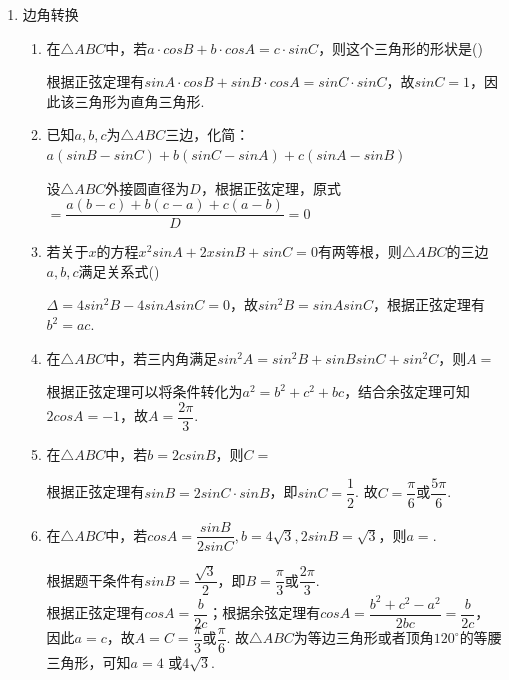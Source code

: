 \begin{enumerate}
\item 边角转换
    \begin{enumerate}
        \item 在$\triangle ABC$中，若$a \cdot cosB + b \cdot cosA = c \cdot sin C$，则这个三角形的形状是\dotfill()
        \begin{jieda}
            根据正弦定理有$sinA \cdot cosB + sinB \cdot cosA = sinC \cdot sin C$，故$sinC = 1$，因此该三角形为直角三角形.
        \end{jieda}
        \item 已知$a,b,c$为$\triangle ABC$三边，化简：$a(sinB - sinC) + b(sinC - sinA) + c(sinA-sinB)$
        \begin{jieda}
            设$\triangle ABC$外接圆直径为$D$，根据正弦定理，原式$ = \dfrac{a(b-c)+b(c-a)+c(a-b)}{D} = 0$
        \end{jieda}
        \item 若关于$x$的方程$x^2sinA + 2xsinB + sinC = 0$有两等根，则$\triangle ABC$的三边$a, b, c$满足关系式\dotfill()
        \begin{jieda}
            $\Delta = 4sin^2B - 4sinAsinC = 0$，故$sin^2B = sinAsinC$，根据正弦定理有$b^2 = ac$.
        \end{jieda}
        \item 在$\triangle ABC$中，若三内角满足$sin^2A = sin^2B + sinBsinC+sin^2C$，则$A = $
        \begin{jieda}
            根据正弦定理可以将条件转化为$a^2 = b^2 + c^2 + bc$，结合余弦定理可知$2cosA = -1$，故$A = \dfrac{2\pi}{3}$.
        \end{jieda}
        \item 在$\triangle ABC$中，若$b = 2csinB$，则$C = $
        \begin{jieda}
            根据正弦定理有$sinB = 2sinC \cdot sinB$，即$sinC = \dfrac{1}{2}$. 故$C = \dfrac{\pi}{6}$或$\dfrac{5\pi}{6}$.
        \end{jieda}
        \item 在$\triangle ABC$中，若$cosA = \dfrac{sinB}{2sinC}, b = 4\sqrt{3}, 2sinB = \sqrt{3}$，则$a = $.
        \begin{jieda}
            根据题干条件有$sinB = \dfrac{\sqrt{3}}{2}$，即$B = \dfrac{\pi}{3}$或$\dfrac{2\pi}{3}$. \\
            根据正弦定理有$cosA = \dfrac{b}{2c}$；根据余弦定理有$cosA = \dfrac{b^2+c^2-a^2}{2bc} = \dfrac{b}{2c}$，因此$a = c$，故$A = C = \dfrac{\pi}{3}$或$\dfrac{\pi}{6}$. 故$\triangle ABC$为等边三角形或者顶角$120^{\circ}$的等腰三角形，可知$a = 4$ 或$4\sqrt{3}$.

\end{jieda}
\end{enumerate}
\end{enumerate}
